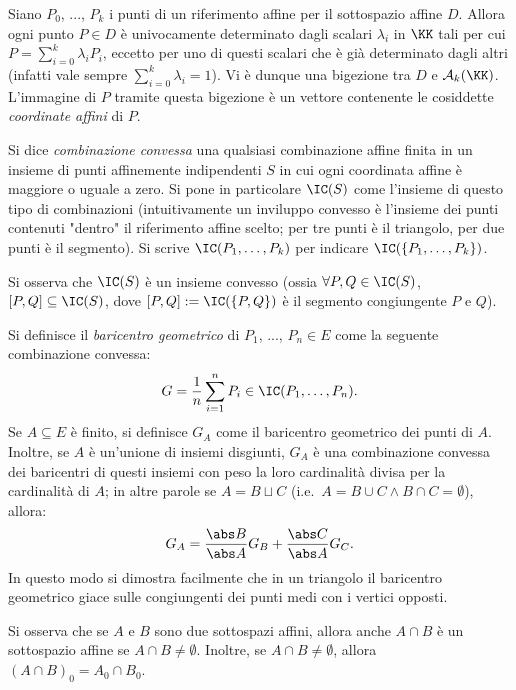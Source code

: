 \documentclass[10pt,landscape]{article}
\begin{document}
\begin{multicols}{3}
		Siano $P_0$, ..., $P_k$ i punti di un riferimento
		affine per il sottospazio affine $D$. Allora ogni
		punto $P \in D$ è univocamente determinato dagli
		scalari $\lambda_i$ in $\KK$ tali per cui $P = \sum_{i=0}^k \lambda_i P_i$, eccetto per uno di questi scalari che è già determinato dagli altri (infatti vale sempre $\sum_{i=0}^k \lambda_i = 1$). Vi è dunque una bigezione tra $D$ e $\mathcal{A}_k(\KK)$. L'immagine di $P$
		tramite questa bigezione è un vettore contenente
		le cosiddette \textit{coordinate affini} di $P$.

		Si dice \textit{combinazione convessa} una qualsiasi
		combinazione affine finita in un insieme di punti affinemente indipendenti $S$ in cui ogni coordinata affine è maggiore o
		uguale a zero. Si pone in particolare $\IC(S)$ come
		l'insieme di questo tipo di combinazioni (intuitivamente un inviluppo convesso è l'insieme dei punti contenuti "dentro" il riferimento affine scelto; per tre punti è il triangolo, per due punti è il segmento). Si scrive $\IC(P_1, \ldots, P_k)$ per indicare $\IC(\{P_1, \ldots, P_k\})$. \\ \vskip 0.05in 
		
		Si osserva che $\IC(S)$ è un insieme
		convesso (ossia $\forall P, Q \in \IC(S)$, $[P, Q] \subseteq \IC(S)$, dove $[P, Q] := \IC(\{P, Q\})$ è il segmento congiungente $P$ e $Q$).

        Si definisce il \textit{baricentro geometrico} di $P_1$, ..., $P_n\in E$ come la seguente combinazione convessa: 
        \[ G=\frac{1}{n}\sum_{i=1}^{n}P_i \in \IC(P_1, \ldots, P_n). \]
        Se $A \subseteq E$ è finito, si definisce $G_A$ come il baricentro geometrico dei punti di $A$. Inoltre,
        se $A$ è un'unione di insiemi disgiunti, $G_A$ è
        una combinazione convessa dei baricentri di questi insiemi con peso la loro cardinalità divisa per la
        cardinalità di $A$; in altre parole se $A=B \sqcup C$ (i.e.~$A = B \cup C \land B \cap C = \emptyset$), allora:
        \[ G_A = \frac{\abs B}{\abs A} G_B + \frac{\abs C}{\abs A} G_C. \]
     	In questo modo si dimostra facilmente che in un triangolo il baricentro geometrico giace sulle
     	congiungenti dei punti medi con i vertici opposti.

		Si osserva che se $A$ e $B$ sono due sottospazi affini, allora anche
		$A \cap B$ è un sottospazio affine se $A \cap B \neq \emptyset$. Inoltre, se $A \cap B \neq \emptyset$,
		allora $(A \cap B)_0 = A_0 \cap B_0$. \\ \vskip 0.05in
		

\end{multicols}
\end{document}
